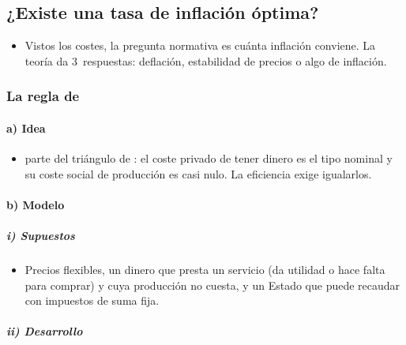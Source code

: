 \documentclass[11pt]{article}
\begin{document}
\subsection{¿Existe una tasa de inflación óptima?}\label{sec:inflacion-optima}

\begin{itemize}
\item Vistos los costes, la pregunta normativa es cuánta inflación conviene. La teoría da 3~respuestas: deflación, estabilidad de precios o algo de inflación\nocite{SchmittGroheUribe2010Optimal}.
\end{itemize}

\subsubsection{La regla de }\label{sec:regla-friedman}

\paragraph{a) Idea}

\begin{itemize}
\item \textcite{Friedman1969Optimum} parte del triángulo de : el coste privado de tener dinero es el tipo nominal y su coste social de producción es casi nulo. La eficiencia exige igualarlos.
\end{itemize}

\paragraph{b) Modelo}

\subparagraph{i) Supuestos}

\begin{itemize}
\item Precios flexibles, un dinero que presta un servicio (da utilidad o hace falta para comprar) y cuya producción no cuesta, y un Estado que puede recaudar con impuestos de suma fija.
\end{itemize}

\subparagraph{ii) Desarrollo}
\end{document}
